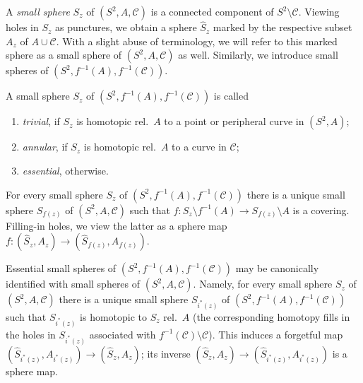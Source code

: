 \documentclass{amsart}
\theoremstyle{plain}
\theoremstyle{definition}
\theoremstyle{remark}
\newcommand{\CC}{{\mathcal C}}
\begin{document}

A \emph{small sphere} $S_z$ of $(S^2,A,\CC)$ is a connected component of $S^2\setminus \CC$. Viewing holes in $S_z$ as punctures, we obtain a sphere $\widehat S_z$ marked by the respective subset $A_z$ of $A\cup \CC$. With a slight abuse of terminology, we will refer to this marked sphere as a small sphere of $(S^2,A,\CC)$ as well. Similarly, we introduce small spheres of $(S^2,f^{-1}(A),f^{-1}(\CC))$. 


A small sphere $S_z$ of $(S^2,f^{-1}(A),f^{-1}(\CC))$ is called
\begin{enumerate}[label=\text{(\roman*)},font=\normalfont,leftmargin=*]
\item \emph{trivial}, if $S_z$ is homotopic rel.\ $A$ to 
a point or peripheral curve in $(S^2,A)$;
\item \emph{annular}, if $S_z$ is homotopic rel.\ $A$ to a curve in $\CC$;
\item \emph{essential}, otherwise.
\end{enumerate}

For every small sphere $S_z$ of $(S^2,f^{-1}(A),f^{-1}(\CC))$ there is a unique small sphere $S_{f(z)}$ of $(S^2,A,\CC)$ such that $f\colon S_z\setminus f^{-1}(A)\to S_{f(z)}\setminus A$ is a covering. Filling-in holes, we view the latter as a sphere map $f\colon (\widehat  S_z,A_z)\to  (\widehat S_{f(z)},A_{f(z)})$. 
 



Essential small spheres of $(S^2,f^{-1}(A),f^{-1}(\CC))$ may be canonically identified with small spheres of $(S^2,A,\CC)$. Namely, for every small sphere $S_z$ of $(S^2,A,\CC)$ there is a unique small sphere $S_{i^*(z)}$ of $(S^2,f^{-1}(A),f^{-1}(\CC))$ such that $S_{i^*(z)}$ is homotopic to $S_z$ rel.\ $A$ (the corresponding homotopy fills in the holes in $S_{i^*(z)}$ associated with $f^{-1}(\CC)\setminus \CC$). This induces a forgetful map $(\widehat S_{i^*(z)}, A_{i^*(z)})\to  (\widehat S_z,A_z)$; its inverse $(\widehat S_z,A_z) \to  (\widehat S_{i^*(z)}, A_{i^*(z)})$ is a sphere map. 
\end{document}
